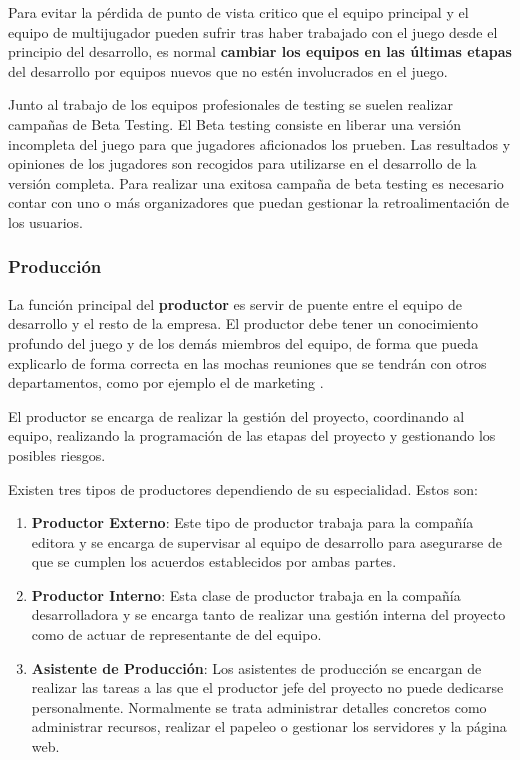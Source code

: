 Para evitar la pérdida de punto de vista critico que el equipo principal y el equipo de multijugador pueden sufrir tras haber trabajado con el juego desde el principio del desarrollo, es normal \textbf{cambiar los equipos en las últimas etapas} del desarrollo por equipos nuevos que no estén involucrados en el juego.

Junto al trabajo de los equipos profesionales de testing se suelen realizar campañas de Beta Testing. El Beta testing consiste en liberar una versión incompleta del juego para que jugadores aficionados los prueben. Las resultados y opiniones de los jugadores son recogidos para utilizarse en el desarrollo de la versión completa. Para realizar una exitosa campaña de beta testing es necesario contar con uno o más organizadores que puedan gestionar la retroalimentación de los usuarios.

\subsubsection{Producción}
La función principal del \textbf{productor} es servir de puente entre el equipo de desarrollo y el resto de la empresa. El productor debe tener un conocimiento profundo del juego y de los demás miembros del equipo, de forma que pueda explicarlo de forma correcta en las mochas reuniones que se tendrán con otros departamentos, como por ejemplo el de marketing \cite{game_design_2}.

El productor se encarga de realizar la gestión del proyecto, coordinando al equipo, realizando la programación de las etapas del proyecto y gestionando los posibles riesgos.

Existen tres tipos de productores dependiendo de su especialidad. Estos son:
\begin{enumerate}
\item \textbf{Productor Externo}: Este tipo de productor trabaja para la compañía editora y se encarga de supervisar al equipo de desarrollo para asegurarse de que se cumplen los acuerdos establecidos por ambas partes.
\item \textbf{Productor Interno}: Esta clase de productor trabaja en la compañía desarrolladora y se encarga tanto de realizar una gestión interna del proyecto como de actuar de representante de del equipo.
\item \textbf{Asistente de Producción}: Los asistentes de producción se encargan de realizar las tareas a las que el productor jefe del proyecto no puede dedicarse personalmente. Normalmente se trata administrar detalles concretos como administrar recursos, realizar el papeleo o gestionar los servidores y la página web.
\end{enumerate}

